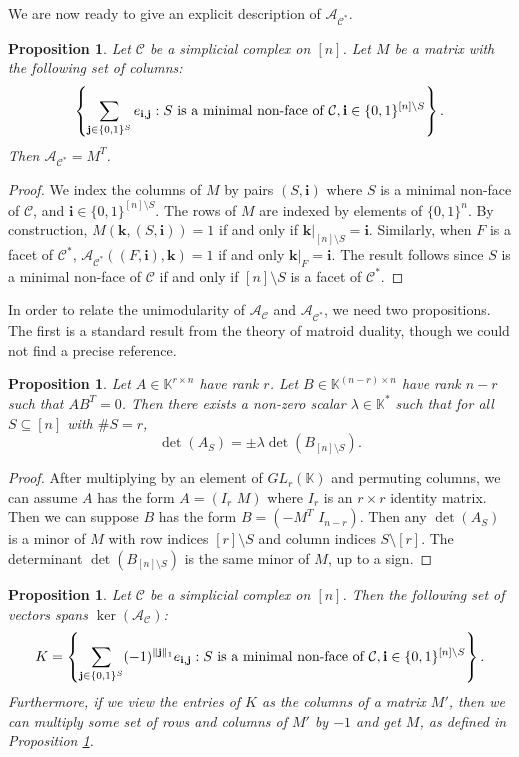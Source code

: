 \documentclass[letterpaper,12pt]{amsart}
\theoremstyle{plain}
\newtheorem{prop}[thm]{Proposition}
\theoremstyle{definition}
\theoremstyle{remark}
\newcommand{\kk}{\mathbb{K}}
\newcommand{\bfi}{\mathbf{i}}
\newcommand{\bfj}{\mathbf{j}}
\newcommand{\bfk}{\mathbf{k}}
\begin{document}
We are now ready to give an explicit description of $\mathcal{A}_{\mathcal{C}^*}$.

\begin{prop}\label{dual_matrix}
	Let $\mathcal{C}$ be a simplicial complex on $[n]$.
	Let $M$ be a matrix with the following set of columns:
	\[
		\left\{\sum_{\bfj \in \{0,1\}^S} e_{\bfi,\bfj} : S \textnormal{ is a minimal non-face of } \mathcal{C}, \bfi \in \{0,1\}^{[n]\setminus S}\right\}.
	\]
	Then $\mathcal{A}_{\mathcal{C}^*} = M^T$.
\end{prop}

\begin{proof}
	We index the columns of $M$ by pairs $(S,\bfi)$ where $S$ is a minimal non-face of $\mathcal{C}$, and $\bfi \in \{0,1\}^{[n]\setminus S}$.
	The rows of $M$ are indexed by elements of $\{0,1\}^n$.
	By construction, $M(\bfk,(S,\bfi))=1$ if and only if $\bfk|_{[n]\setminus S} = \bfi$.
	Similarly, when $F$ is a facet of $\mathcal{C}^*$, $\mathcal{A}_{\mathcal{C}^*}((F,\bfi),\bfk) = 1$ if and only $\bfk|_{F}=\bfi$.
	The result follows since $S$ is a minimal non-face of $\mathcal{C}$ if and only if $[n]\setminus S$ is a facet of $\mathcal{C}^*$.
\end{proof}

In order to relate the unimodularity of $\mathcal{A}_\mathcal{C}$ and $\mathcal{A}_{\mathcal{C}^*}$, we need two propositions.  The first
is a standard result from the theory of matroid duality, {though we could not find
a precise reference}.

\begin{prop}\label{dualdet}
	Let $A \in \kk^{r\times n}$ have rank $r$.
	Let $B \in \kk^{(n-r)\times n}$ have rank $n-r$ such that $AB^T=0$.
	Then there exists a non-zero scalar $\lambda \in \kk^*$ such that for all $S\subseteq[n]$ with $\#S=r$,
	\[\det(A_S)= \pm\lambda \det(B_{[n]\setminus S}).\]
\end{prop}

{
\begin{proof}
After multiplying by an element of $GL_r(\kk)$ and permuting columns, we can assume
$A$ has the form $A = ( I_r \, \, M)$ where $I_r$ is an $r \times r$ identity matrix.  Then
we can suppose $B$ has the form  $B = (-M^T \, \,  I_{n-r})$.  Then any $\det(A_S)$ is a minor
of $M$ with row indices $[r] \setminus S$ and column indices $S \setminus [r]$.
The determinant $\det(B_{[n] \setminus S})$ is the same minor of $M$, up to a sign. 
\end{proof}
}


\begin{prop}\label{spanningset}
	Let $\mathcal{C}$ be a simplicial complex on $[n]$.
	Then the following set of vectors spans $\ker(\mathcal{A}_\mathcal{C})$:
	\[
		K=\left\{\sum_{\bfj \in \{0,1\}^S} (-1)^{\|\bfj\|_1} e_{\bfi,\bfj} : S \textnormal{ is a minimal non-face of } \mathcal{C}, \bfi \in \{0,1\}^{[n]\setminus S}\right\}.
	\]
	Furthermore, if we view the entries of $K$ as the columns of a matrix $M'$, then we can multiply some set of
	rows and columns of $M'$ by $-1$ and get $M$, as defined in Proposition \ref{dual_matrix}.
\end{prop}
\end{document}
